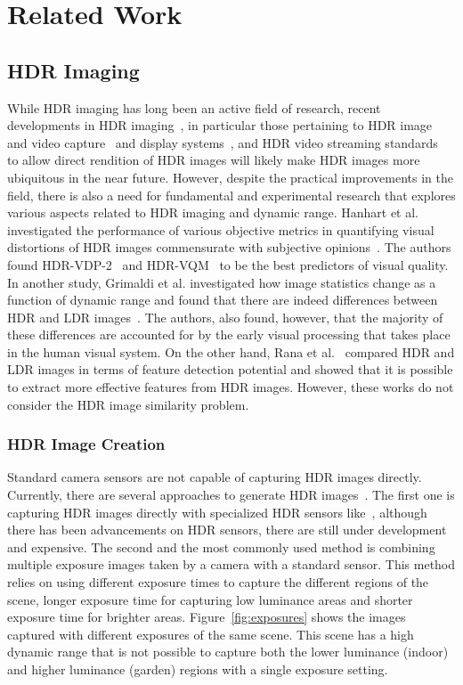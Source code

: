 \chapter{Related Work}
\label{chp:b2}

\section{HDR Imaging}

While HDR imaging has long been an active field of research, recent developments in HDR imaging~\cite{Rein2010,Banterle2011,chalmers2016high}, in particular those pertaining to HDR image and video capture~\cite{tocci2011versatile,froehlich2014creating} and display systems~\cite{seetzen2004high}, and HDR
video streaming standards~\cite{standard2016dynamic} to allow direct rendition of HDR images will likely make HDR images more ubiquitous in the near future. However, despite the practical improvements in the field, there is also a need for fundamental and experimental research that explores various aspects related to HDR imaging and dynamic range. Hanhart et al. investigated the performance of various objective metrics in quantifying visual distortions of HDR images commensurate with subjective opinions~\cite{hanhart2015benchmarking}. The authors found HDR-VDP-2~\cite{mantiuk2011hdr} and HDR-VQM~\cite{narwaria2015hdr} to be the best predictors of visual quality. In another study, Grimaldi et al. investigated how image statistics change as a function of dynamic range and found that there are indeed differences between HDR and LDR images~\cite{grimaldi2019statistics}. The authors, also found, however, that the majority of these differences are accounted for by the early visual processing that takes place in the human visual system. On the other hand, Rana et al.~\cite{rana2015evaluation} compared HDR and LDR images in terms of feature detection potential and showed that it is possible to extract more effective features from HDR images. However, these works do not consider the HDR image similarity problem.

\subsection{HDR Image Creation}
Standard camera sensors are not capable of capturing HDR images directly. Currently, there are several approaches to generate HDR images~\cite{banterle2017advanced}. The first one is capturing HDR images directly with specialized HDR sensors like~\cite{zhao2015unbounded}, although there has been advancements on HDR sensors, there are still under development and expensive. The second and the most commonly used method is combining multiple exposure images taken by a camera with a standard sensor. This method relies on using different exposure times to capture the different regions of the scene, longer exposure time for capturing  low luminance areas and shorter exposure time for brighter areas. Figure~\ref{fig:exposures} shows the images captured with different exposures of the same scene. This scene has a high dynamic range that is not possible to capture both the lower luminance (indoor) and higher luminance (garden) regions with a single exposure setting.

